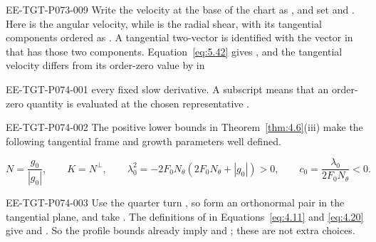 \begin{EESegment}{EE-TGT-P073-009}
Write the velocity at the base of the chart as , and set  and . Here  is the angular velocity, while  is the radial shear, with its tangential components ordered as . A tangential two-vector is identified with the vector in  that has those two components. Equation~\eqref{eq:5.42} gives , and the tangential velocity differs from its order-zero value by  in
\end{EESegment}
\begin{EESegment}{EE-TGT-P074-001}
every fixed slow derivative. A subscript  means that an order-zero quantity is evaluated at the chosen representative .
\end{EESegment}

\begin{EESegment}{EE-TGT-P074-002}
The positive lower bounds in Theorem~\ref{thm:4.6}(iii) make the following tangential frame and growth parameters well defined.
\end{EESegment}
\[
N=\frac{g_0}{|g_0|},\qquad K=N^\perp,\qquad
\lambda_0^2=-2F_0N_\theta(2F_0N_\theta+|g_0|)>0,\qquad
c_0=\frac{\lambda_0}{2F_0N_\theta}<0.
\]
\begin{EESegment}{EE-TGT-P074-003}
Use the quarter turn , so  form an orthonormal pair in the tangential plane, and take . The definitions of  in Equations~\eqref{eq:4.11} and \eqref{eq:4.20} give  and . So the profile bounds already imply  and ; these are not extra choices.
\end{EESegment}

